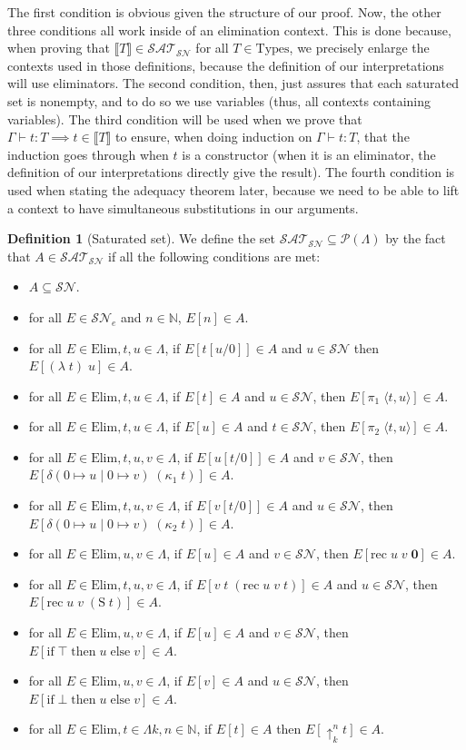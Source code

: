 \documentclass{article}
\newcommand{\SN}[0]{\mathcal{SN}}
\newcommand{\ife}[3]{\mathrm{if}\;#1\;\mathrm{then}\;#2\;\mathrm{else}\;#3}
\newcommand{\bO}[0]{\boldsymbol{0}}
\newcommand{\Ss}[0]{\mathrm{S}}
\newcommand{\rec}[0]{\mathrm{rec}}
\newcommand{\Tt}[0]{\top}
\newcommand{\Ff}[0]{\bot}
\newcommand{\bN}[0]{\mathbb N}
\newcommand{\lift}[2]{\uparrow_{#1}^{#2}}
\newcommand{\deltacase}[3]{\delta(0\mapsto #1\mid 0 \mapsto #2)\;#3}
\newcommand{\Types}[0]{\mathrm{Types}}
\newcommand{\Elim}[0]{\mathrm{Elim}}
\newcommand{\SAT}[0]{\mathcal{SAT}_{\mathcal{SN}}}
\theoremstyle{definition}
\newtheorem{defi}{Definition}
\begin{document}
The first condition is obvious given the structure of our proof. Now, the other three conditions all work
inside of an elimination context. This is done because, when proving that $\llbracket T \rrbracket \in\SAT$
for all $T\in\Types$, we precisely enlarge the contexts used in those definitions, because the definition of
our interpretations will use eliminators. The second condition, then, just assures that each saturated set
is nonempty, and to do so we use variables (thus, all contexts containing variables). The third condition
will be used when we prove that $\Gamma\vdash t : T \implies t \in \llbracket T \rrbracket$ to ensure, when
doing induction on $\Gamma\vdash t : T$, that the induction goes through when $t$ is a constructor (when it
is an eliminator, the definition of our interpretations directly give the result). The fourth condition
is used when stating the adequacy theorem later, because we need to be able to lift a context to have
simultaneous substitutions in our arguments.

\begin{defi}[Saturated set]
    We define the set $\SAT\subseteq\mathcal P(\Lambda)$ by the fact that $A \in \SAT$ if all the
    following conditions are met:
    \begin{itemize}
        \item $A\subseteq \SN$.
        \item for all $E\in\SN_e$ and $n\in\bN$, $E[n]\in A$.
        \item for all $E\in\Elim, t,u\in\Lambda$, if $E[t[u/0]]\in A$ and $u\in\SN$ then
        $E[(\lambda\;t)\;u]\in A$.
        \item for all $E\in\Elim, t,u\in\Lambda$, if $E[t]\in A$ and $u\in\SN$, then $E[\pi_1\;\langle
        t,u\rangle]\in A$.
        \item for all $E\in\Elim, t,u\in\Lambda$, if $E[u]\in A$ and $t\in\SN$, then $E[\pi_2\;\langle
        t,u\rangle]\in A$.
        \item for all $E\in\Elim, t,u,v\in\Lambda$, if $E[u[t/0]]\in A$ and $v\in\SN$, then
        $E[\deltacase{u}{v}{(\kappa_1\;t)}]\in A$.
        \item for all $E\in\Elim, t,u,v\in\Lambda$, if $E[v[t/0]]\in A$ and $u\in\SN$, then
        $E[\deltacase{u}{v}{(\kappa_2\;t)}]\in A$.
        \item for all $E\in\Elim, u,v\in\Lambda$, if $E[u]\in A$ and $v\in\SN$, then
        $E[\rec\;u\;v\;\bO]\in A$.
        \item for all $E\in\Elim, t,u,v\in\Lambda$, if $E[v\;t\;(\rec\;u\;v\;t)]\in A$ and $u\in \SN$, then
        $E[\rec\;u\;v\;(\Ss\;t)]\in A$.
        \item for all $E\in\Elim, u,v\in\Lambda$, if $E[u]\in A$ and $v\in\SN$, then
        $E[\ife{\Tt}{u}{v}]\in A$.
        \item for all $E\in\Elim, u,v\in\Lambda$, if $E[v]\in A$ and $u\in\SN$, then
        $E[\ife{\Ff}{u}{v}]\in A$.
        \item for all $E\in\Elim, t\in\Lambda k,n\in\bN$, if $E[t]\in A$ then $E[\lift k n t]\in A$.
    \end{itemize}
\end{defi}
\end{document}
